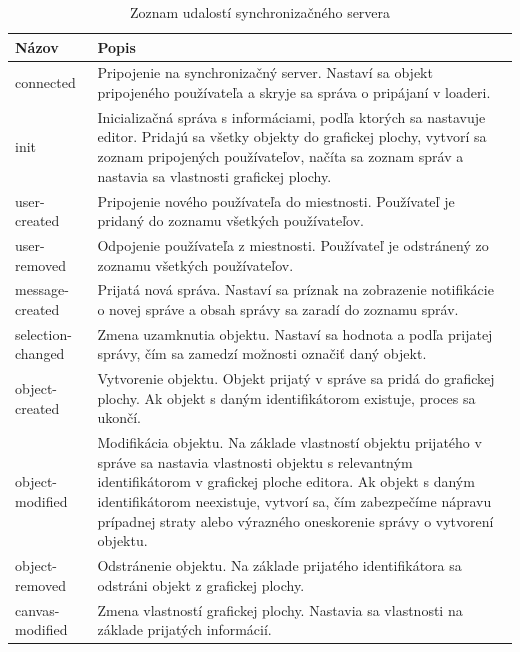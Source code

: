 \begin{table}
	\begin{tabular}{ | m{4cm} | m{8.5cm} | } \hline
		\textbf{Názov} & \textbf{Popis} \\ \hline \hline
		
		connected & Pripojenie na synchronizačný server. Nastaví sa objekt pripojeného používateľa a skryje sa správa o pripájaní v loaderi. \\\hline
		init & Inicializačná správa s informáciami, podľa ktorých sa nastavuje editor. Pridajú sa všetky objekty do grafickej plochy, vytvorí sa zoznam pripojených používateľov, načíta sa zoznam správ a nastavia sa vlastnosti grafickej plochy. \\\hline
		user-created & Pripojenie nového používateľa do miestnosti. Používateľ je pridaný do zoznamu všetkých používateľov. \\\hline
		user-removed & Odpojenie používateľa z miestnosti. Používateľ je odstránený zo zoznamu všetkých používateľov. \\\hline
		message-created & Prijatá nová správa. Nastaví sa príznak na zobrazenie notifikácie o novej správe a obsah správy sa zaradí do zoznamu správ. \\\hline
		selection-changed & Zmena uzamknutia objektu. Nastaví sa hodnota \code{selectable} a \code{selectedBy} podľa prijatej správy, čím sa zamedzí možnosti označiť daný objekt. \\\hline
		object-created & Vytvorenie objektu. Objekt prijatý v správe sa pridá do grafickej plochy. Ak objekt s daným identifikátorom existuje, proces sa ukončí. \\\hline
		object-modified & Modifikácia objektu. Na základe vlastností objektu prijatého v správe sa nastavia vlastnosti objektu s relevantným identifikátorom v grafickej ploche editora. Ak objekt s daným identifikátorom neexistuje, vytvorí sa, čím zabezpečíme nápravu prípadnej straty alebo výrazného oneskorenie správy o vytvorení objektu. \\\hline
		object-removed & Odstránenie objektu. Na základe prijatého identifikátora sa odstráni objekt z grafickej plochy. \\\hline
 		canvas-modified & Zmena vlastností grafickej plochy. Nastavia sa vlastnosti na základe prijatých informácií. \\\hline
		   
		\hline
	\end{tabular}
	\caption{Zoznam udalostí synchronizačného servera}
\label{tab:server-events}
\end{table}
\FloatBarrier
